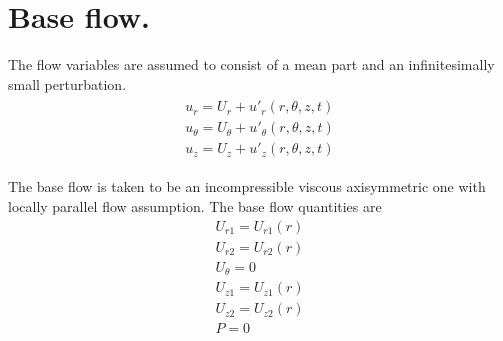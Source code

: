 \documentclass{article}
\begin{document}
\section{Base flow.}
The flow variables are assumed to consist of a mean part and an infinitesimally small perturbation.
\begin{equation}
\begin{align}
\begin{split}
  u_{r} = U_{r} + u'_{r}(r,\theta,z,t) \\
  u_{\theta} = U_{\theta} +u'_{\theta}(r,\theta,z,t) \\
  u_{z} = U_{z}+ u'_{z}(r,\theta,z,t)  
\end{split}
\end{align}
\end{equation}

The base flow is taken to be an incompressible viscous axisymmetric one with locally parallel flow assumption.
The base flow quantities are
\begin{equation}
\begin{split}
U_{r1} = U_{r1}(r) \\
U_{r2} = U_{r2}(r) \\
U_{\theta} = 0 \\
U_{z1} = U_{z1}(r) \\ 
U_{z2} = U_{z2}(r) \\
P = 0 \\
\end{split}
\end{equation}
\end{document}
